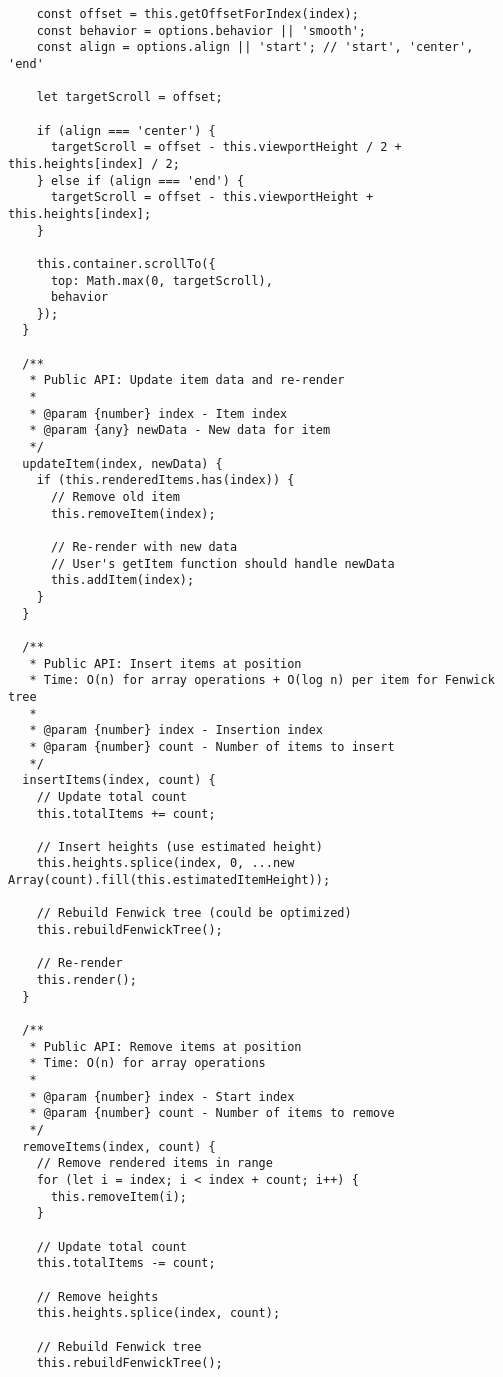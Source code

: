\documentclass[11pt]{article}
\begin{document}
\begin{verbatim}
    const offset = this.getOffsetForIndex(index);
    const behavior = options.behavior || 'smooth';
    const align = options.align || 'start'; // 'start', 'center', 'end'
    
    let targetScroll = offset;
    
    if (align === 'center') {
      targetScroll = offset - this.viewportHeight / 2 + this.heights[index] / 2;
    } else if (align === 'end') {
      targetScroll = offset - this.viewportHeight + this.heights[index];
    }
    
    this.container.scrollTo({
      top: Math.max(0, targetScroll),
      behavior
    });
  }
  
  /**
   * Public API: Update item data and re-render
   * 
   * @param {number} index - Item index
   * @param {any} newData - New data for item
   */
  updateItem(index, newData) {
    if (this.renderedItems.has(index)) {
      // Remove old item
      this.removeItem(index);
      
      // Re-render with new data
      // User's getItem function should handle newData
      this.addItem(index);
    }
  }
  
  /**
   * Public API: Insert items at position
   * Time: O(n) for array operations + O(log n) per item for Fenwick tree
   * 
   * @param {number} index - Insertion index
   * @param {number} count - Number of items to insert
   */
  insertItems(index, count) {
    // Update total count
    this.totalItems += count;
    
    // Insert heights (use estimated height)
    this.heights.splice(index, 0, ...new Array(count).fill(this.estimatedItemHeight));
    
    // Rebuild Fenwick tree (could be optimized)
    this.rebuildFenwickTree();
    
    // Re-render
    this.render();
  }
  
  /**
   * Public API: Remove items at position
   * Time: O(n) for array operations
   * 
   * @param {number} index - Start index
   * @param {number} count - Number of items to remove
   */
  removeItems(index, count) {
    // Remove rendered items in range
    for (let i = index; i < index + count; i++) {
      this.removeItem(i);
    }
    
    // Update total count
    this.totalItems -= count;
    
    // Remove heights
    this.heights.splice(index, count);
    
    // Rebuild Fenwick tree
    this.rebuildFenwickTree();
    

\end{verbatim}
\end{document}
